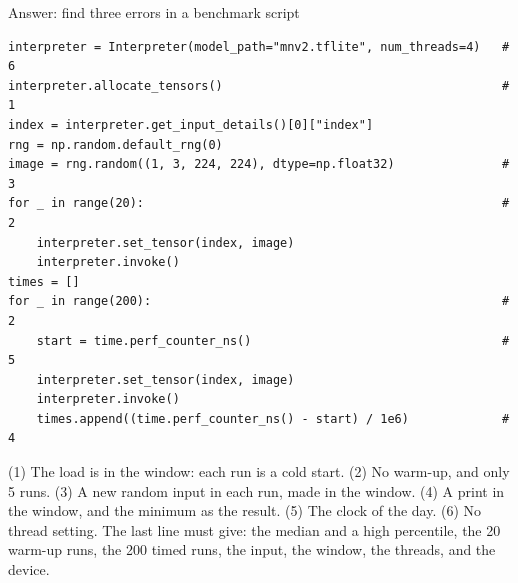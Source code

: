 \begin{frame}[fragile]{Answer: find three errors in a benchmark script}
\begin{lstlisting}[style=python]
interpreter = Interpreter(model_path="mnv2.tflite", num_threads=4)   # 6
interpreter.allocate_tensors()                                       # 1
index = interpreter.get_input_details()[0]["index"]
rng = np.random.default_rng(0)
image = rng.random((1, 3, 224, 224), dtype=np.float32)               # 3
for _ in range(20):                                                  # 2
    interpreter.set_tensor(index, image)
    interpreter.invoke()
times = []
for _ in range(200):                                                 # 2
    start = time.perf_counter_ns()                                   # 5
    interpreter.set_tensor(index, image)
    interpreter.invoke()
    times.append((time.perf_counter_ns() - start) / 1e6)             # 4
\end{lstlisting}
  \begin{answerblock}
    \footnotesize
    (1) The load is in the window: each run is a cold start.
    (2) No warm-up, and only 5 runs.
    (3) A new random input in each run, made in the window.
    (4) A print in the window, and the minimum as the result.
    (5) The clock of the day.
    (6) No thread setting.
    The last line must give: the median and a high percentile, the 20
    warm-up runs, the 200 timed runs, the input, the window, the threads,
    and the device.
  \end{answerblock}
\end{frame}
